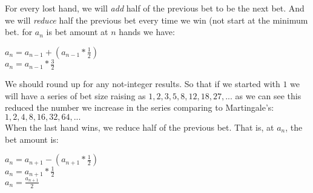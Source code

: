 \documentclass{article}
\begin{document}
For every lost hand, we will \emph{add} half of the previous bet to be the next bet.  And we will \emph{reduce} half the previous bet every time we win (not start at the minimum bet.  for $a_n$ is bet amount at $n$ hands we have:
\begin{center}
$a_n= a_{n-1}+(a_{n-1}*\frac{1}{2})$\\
$a_n= a_{n-1}*\frac{3}{2}$\\
\end{center}

We should round up for any not-integer results.  So that if we started with $1$ we will have a series of bet size raising as $1, 2, 3, 5, 8, 12, 18, 27, ...$ as we can see this reduced the number we increase in the series comparing to Martingale's: $1,2,4,8,16,32,64,...$ \\

When the last hand wins, we reduce half of the previous bet. That is, at $a_n$, the bet amount is:\par
\begin{center}
$a_n=a_{n+1}-(a_{n+1}*\frac{1}{2})$\\
$a_n=a_{n+1}*\frac{1}{2}$\\
$a_n=\frac{a_{n+1}}{2}$\\
\end{center}
\end{document}
